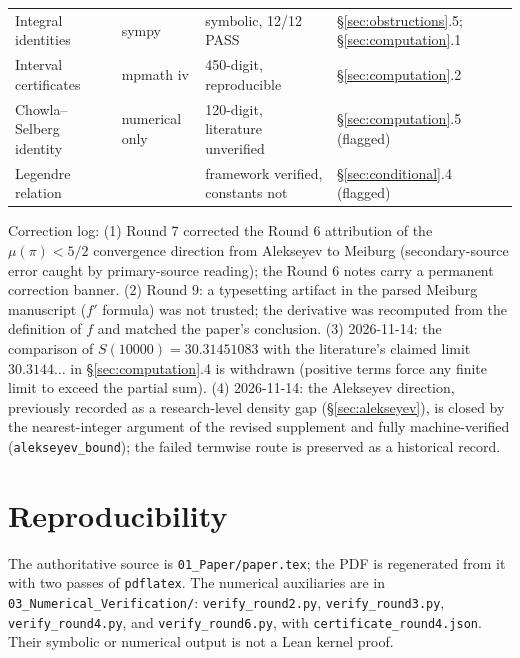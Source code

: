 \documentclass[11pt]{amsart}
\theoremstyle{definition}
\theoremstyle{remark}
\numberwithin{equation}{section}
\newcommand{\irr}{\mu}
\begin{document}
\begin{center}
\begin{tabularx}{\textwidth}{@{}p{}p{}p{}X@{}}
Integral identities & sympy & symbolic, 12/12 PASS & \S\ref{sec:obstructions}.5; \S\ref{sec:computation}.1 \\
Interval certificates & mpmath iv & 450-digit, reproducible & \S\ref{sec:computation}.2 \\
Chowla--Selberg identity & numerical only & 120-digit, literature unverified & \S\ref{sec:computation}.5 (flagged) \\
Legendre relation & \cite{DLMF23} & framework verified, constants not & \S\ref{sec:conditional}.4 (flagged) \\
\bottomrule
\end{tabularx}
\end{center}

Correction log: (1) Round 7 corrected the Round 6 attribution of the $\irr(\pi)<5/2$ convergence direction from Alekseyev to Meiburg (secondary-source error caught by primary-source reading); the Round 6 notes carry a permanent correction banner. (2) Round 9: a typesetting artifact in the parsed Meiburg manuscript ($f'$ formula) was not trusted; the derivative was recomputed from the definition of $f$ and matched the paper's conclusion. (3) 2026-11-14: the comparison of $S(10000)=30.31451083$ with the literature's claimed limit $30.3144\dots$ in \S\ref{sec:computation}.4 is withdrawn (positive terms force any finite limit to exceed the partial sum). (4) 2026-11-14: the Alekseyev direction, previously recorded as a research-level density gap (\S\ref{sec:alekseyev}), is closed by the nearest-integer argument of the revised supplement and fully machine-verified (\texttt{alekseyev\_\allowbreak{}bound}); the failed termwise route is preserved as a historical record.

\section{Reproducibility}\label{app:repro}

The authoritative source is \texttt{01\_\allowbreak{}Paper/\allowbreak{}paper.tex}; the PDF is regenerated from it with two passes of \texttt{pdflatex}. The numerical auxiliaries are in \texttt{03\_\allowbreak{}Numerical\_\allowbreak{}Verification/\allowbreak{}}: \texttt{verify\_\allowbreak{}round2.py}, \texttt{verify\_\allowbreak{}round3.py}, \texttt{verify\_\allowbreak{}round4.py}, and \texttt{verify\_\allowbreak{}round6.py}, with \texttt{certificate\_\allowbreak{}round4.json}. Their symbolic or numerical output is not a Lean kernel proof.
\end{document}
